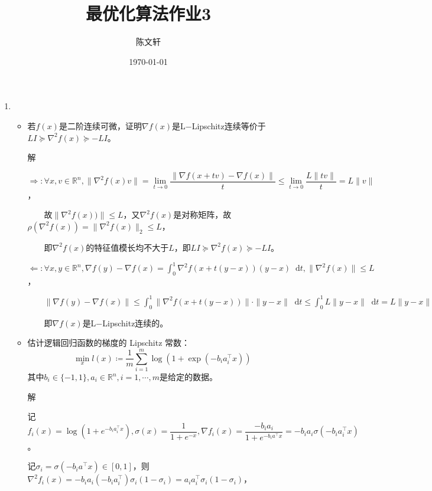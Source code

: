 \documentclass[cn,hazy,cyan,11pt,normal]{elegantnote}
\title{最优化算法作业3}
\author{陈文轩}
\date{\today}
\newcommand*{\diff}{\mathop{}\!\mathrm{d}}
\begin{document}
    \maketitle

    \begin{enumerate}
        \item
            \begin{itemize}
                \item {\color{c1}若$f(x)$是二阶连续可微，证明$\nabla f(x)$是L−Lipschitz连续等价于$LI\succeq \nabla^2 f(x)\succeq -LI$。}

                    \textcolor{c2}解

                    $\Longrightarrow:\forall x,v\in\mathbb{R}^n,\|\nabla^2 f(x)v\|=\lim\limits_{t\rightarrow0}\dfrac{\|\nabla f(x+tv)-\nabla f(x)\|}{t}\leq\lim\limits_{t\rightarrow0}\dfrac{L\|tv\|}{t}=L\|v\| $，

                    $\qquad$故$\|\nabla^2 f(x))\|\leq L$，又$\nabla^2 f(x)$是对称矩阵，故$\rho(\nabla^2 f(x))=\|\nabla^2 f(x)\|_2\leq L$，

                    $\qquad$即$\nabla^2 f(x)$的特征值模长均不大于$L$，即$LI\succeq \nabla^2 f(x)\succeq -LI$。

                    $\Longleftarrow:\forall x,y\in\mathbb{R}^n,\nabla f(y)-\nabla f(x)=\int_0^1\nabla^2 f(x+t(y-x))(y-x)\diff t,\|\nabla^2 f(x)\|\leq L$，

                    $\qquad\|\nabla f(y)-\nabla f(x)\|\leq\int_0^1\|\nabla^2 f(x+t(y-x))\|\cdot\|y-x\|\diff t\leq\int_{0}^{1}L\|y-x\|\diff t=L\|y-x\|$

                    $\qquad$即$\nabla f(x)$是L−Lipschitz连续的。\vspace{0.5cm}

                \item {\color{c1}估计逻辑回归函数的梯度的 Lipschitz 常数：
                    \[\min_x l(x)\coloneqq\frac1m\sum_{i=1}^m\log(1+\exp(-b_i a_i^{\top} x))\]
                    其中$b_i\in\{-1,1\},a_i\in\mathbb{R}^n,i=1,\cdots,m$是给定的数据。}

                    \vspace{0.5cm}\textcolor{c2}解

                    记$f_i(x)=\log(1+e^{-b_i a_i^{\top} x}),\sigma(x)=\dfrac1{1+e^{-x}},\nabla f_i(x)=\dfrac{-b_i a_i}{1+e^{-b_{i}a^{\top}x}}=-b_i a_i\sigma(-b_{i}a_i^{\top}x)$。

                    记$\sigma_i=\sigma(-b_{i}a^{\top}x)\in[0,1]$，则$\nabla^2 f_i(x)=-b_i a_i(-b_i a_i^{\top})\sigma_i(1-\sigma_i)=a_i a_i^{\top}\sigma_i(1-\sigma_i)$，


\end{itemize}
\end{enumerate}
\end{document}
